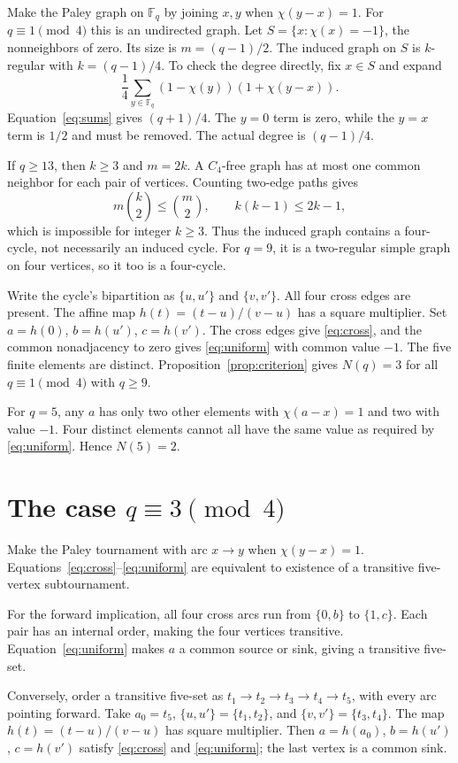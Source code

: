 \documentclass[11pt,a4paper]{article}
\newcommand{\F}{\mathbb{F}}
\begin{document}
Make the Paley graph on $\F_q$ by joining $x,y$ when $\chi(y-x)=1$.
For $q\equiv1\pmod4$ this is an undirected graph. Let
$S=\{x:\chi(x)=-1\}$, the nonneighbors of zero. Its size is
$m=(q-1)/2$. The induced graph on $S$ is $k$-regular with $k=(q-1)/4$.
To check the degree directly, fix $x\in S$ and expand
\[
\frac14\sum_{y\in\F_q}(1-\chi(y))(1+\chi(y-x)).
\]
Equation~\eqref{eq:sums} gives $(q+1)/4$. The $y=0$ term is zero, while
the $y=x$ term is $1/2$ and must be removed. The actual degree is $(q-1)/4$.

If $q\ge13$, then $k\ge3$ and $m=2k$. A $C_4$-free graph has at most one
common neighbor for each pair of vertices. Counting two-edge paths gives
\[
m\binom{k}{2}\le\binom{m}{2},\qquad k(k-1)\le2k-1,
\]
which is impossible for integer $k\ge3$. Thus the induced graph contains
a four-cycle, not necessarily an induced cycle. For $q=9$, it is a
two-regular simple graph on four vertices, so it too is a four-cycle.

Write the cycle's bipartition as $\{u,u'\}$ and $\{v,v'\}$. All four cross
edges are present. The affine map $h(t)=(t-u)/(v-u)$ has a square multiplier.
Set $a=h(0)$, $b=h(u')$, $c=h(v')$. The cross edges give
\eqref{eq:cross}, and the common nonadjacency to zero gives
\eqref{eq:uniform} with common value $-1$. The five finite elements are
distinct. Proposition~\ref{prop:criterion} gives $N(q)=3$ for all
$q\equiv1\pmod4$ with $q\ge9$.

For $q=5$, any $a$ has only two other elements with $\chi(a-x)=1$ and two
with value $-1$. Four distinct elements cannot all have the same value as
required by \eqref{eq:uniform}. Hence $N(5)=2$.

\section{The case \texorpdfstring{$q\equiv3\pmod4$}{q = 3 (mod 4)}}
Make the Paley tournament with arc $x\to y$ when $\chi(y-x)=1$.
Equations~\eqref{eq:cross}--\eqref{eq:uniform} are equivalent to existence
of a transitive five-vertex subtournament.

For the forward implication, all four cross arcs run from $\{0,b\}$ to
$\{1,c\}$. Each pair has an internal order, making the four vertices
transitive. Equation~\eqref{eq:uniform} makes $a$ a common source or sink,
giving a transitive five-set.

Conversely, order a transitive five-set as $t_1\to t_2\to t_3\to t_4\to t_5$,
with every arc pointing forward. Take $a_0=t_5$, $\{u,u'\}=\{t_1,t_2\}$,
and $\{v,v'\}=\{t_3,t_4\}$. The map $h(t)=(t-u)/(v-u)$ has square
multiplier. Then $a=h(a_0)$, $b=h(u')$, $c=h(v')$ satisfy
\eqref{eq:cross} and \eqref{eq:uniform}; the last vertex is a common sink.
\end{document}
